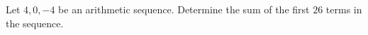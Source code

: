 Let $4,0,-4$ be an arithmetic sequence. Determine the sum of the first $26$ terms in the sequence.\\